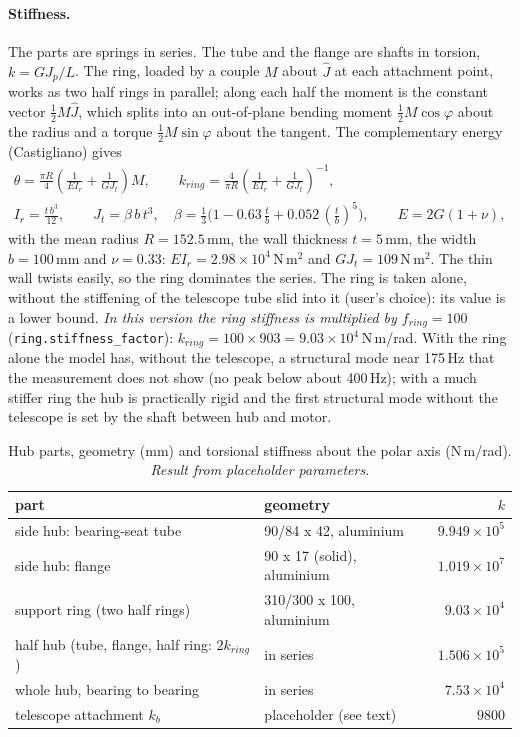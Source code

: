 \documentclass[10pt,a4paper]{article}
\numberwithin{equation}{section}
\begin{document}
\paragraph{Stiffness.} The parts are springs in series. The tube and the flange are shafts in torsion, $k = G J_p/L$. The ring, loaded by a couple $M$ about $\hat J$ at each attachment point, works as two half rings in parallel; along each half the moment is the constant vector $\tfrac12 M\hat J$, which splits into an out-of-plane bending moment $\tfrac12 M\cos\varphi$ about the radius and a torque $\tfrac12 M\sin\varphi$ about the tangent. The complementary energy (Castigliano) gives
\begin{gather}
\theta = \frac{\pi R}{4}\left(\frac{1}{E I_r} + \frac{1}{G J_t}\right) M,\qquad k_{ring} = \frac{4}{\pi R}\left(\frac{1}{E I_r} + \frac{1}{G J_t}\right)^{-1},\\
I_r = \frac{t\,b^3}{12},\qquad J_t = \beta\,b\,t^3,\quad \beta = \tfrac13\bigl(1 - 0.63\,\tfrac tb + 0.052\,(\tfrac tb)^5\bigr),\qquad E = 2G(1 + \nu),
\end{gather}
with the mean radius $R = 152.5$\,mm, the wall thickness $t = 5$\,mm, the width $b = 100$\,mm and $\nu = 0.33$: $E I_r = 2.98\times10^{4}$\,N\,m$^2$ and $G J_t = 109$\,N\,m$^2$. The thin wall twists easily, so the ring dominates the series. The ring is taken alone, without the stiffening of the telescope tube slid into it (user's choice): its value is a lower bound. \emph{In this version the ring stiffness is multiplied by $f_{ring} = 100$} (\texttt{ring.stiffness\_factor}): $k_{ring} = 100 \times 903 = 9.03\times10^{4}$\,N\,m/rad. With the ring alone the model has, without the telescope, a structural mode near 175\,Hz that the measurement does not show (no peak below about 400\,Hz); with a much stiffer ring the hub is practically rigid and the first structural mode without the telescope is set by the shaft between hub and motor.
\begin{table}[H]\centering\small
\caption{Hub parts, geometry (mm) and torsional stiffness about the polar axis (N\,m/rad). \emph{Result from placeholder parameters.}}\label{tab:hub_parts}
\begin{tabular}{llr}\toprule
part & geometry & $k$ \\ \midrule
side hub: bearing-seat tube & 90/84 x 42, aluminium & $9.949\times10^{5}$ \\
side hub: flange & 90 x 17 (solid), aluminium & $1.019\times10^{7}$ \\
support ring (two half rings) & 310/300 x 100, aluminium & $9.03\times10^{4}$ \\
\midrule
half hub (tube, flange, half ring: $2k_{ring}$) & in series & $1.506\times10^{5}$ \\
whole hub, bearing to bearing & in series & $7.53\times10^{4}$ \\
telescope attachment $k_b$ & placeholder (see text) & $9800$ \\
\bottomrule\end{tabular}\end{table}
\end{document}
